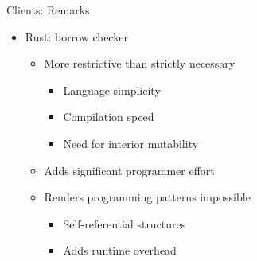 \begin{frame}[t]{Clients: Remarks}

    \begin{itemize}
        \itemsep.3em

        \item Rust: borrow checker
            \begin{itemize}
                \item More restrictive than strictly necessary
                    \begin{itemize}
                        \item Language simplicity
                        \item Compilation speed
                        \item Need for interior mutability
                    \end{itemize}
                \item Adds significant programmer effort
                \item Renders programming patterns impossible
                    \begin{itemize}
                        \item Self-referential structures
                        \item Adds runtime overhead
                    \end{itemize}
            \end{itemize}

    \end{itemize}

    \vfill

\end{frame}

